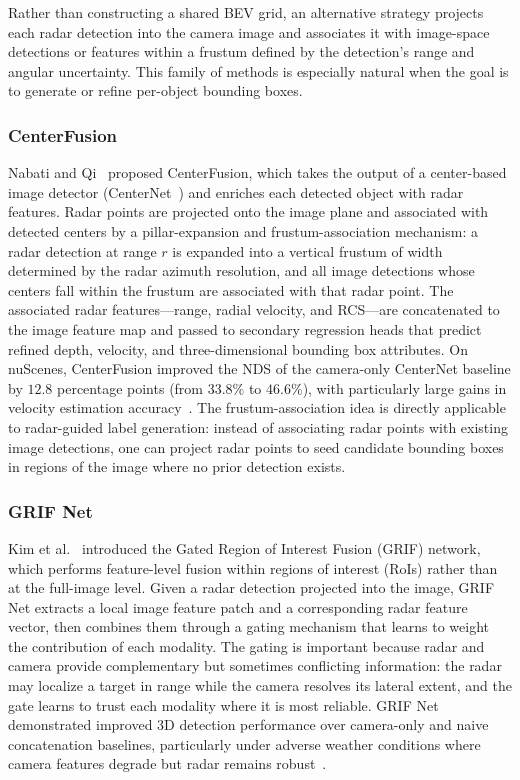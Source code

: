 Rather than constructing a shared BEV grid, an alternative strategy projects each radar detection into the camera image and associates it with image-space detections or features within a frustum defined by the detection's range and angular uncertainty. This family of methods is especially natural when the goal is to generate or refine per-object bounding boxes.

\subsubsection{CenterFusion}

Nabati and Qi~\cite{Nabati2021CenterFusion} proposed CenterFusion, which takes the output of a center-based image detector (CenterNet~\cite{zhou2019objects}) and enriches each detected object with radar features. Radar points are projected onto the image plane and associated with detected centers by a pillar-expansion and frustum-association mechanism: a radar detection at range $r$ is expanded into a vertical frustum of width determined by the radar azimuth resolution, and all image detections whose centers fall within the frustum are associated with that radar point. The associated radar features---range, radial velocity, and RCS---are concatenated to the image feature map and passed to secondary regression heads that predict refined depth, velocity, and three-dimensional bounding box attributes. On nuScenes, CenterFusion improved the NDS of the camera-only CenterNet baseline by $12.8$ percentage points (from $33.8\%$ to $46.6\%$), with particularly large gains in velocity estimation accuracy~\cite{Nabati2021CenterFusion}. The frustum-association idea is directly applicable to radar-guided label generation: instead of associating radar points with existing image detections, one can project radar points to seed candidate bounding boxes in regions of the image where no prior detection exists.

\subsubsection{GRIF Net}

Kim et al.~\cite{Kim2020GRIFNet} introduced the Gated Region of Interest Fusion (GRIF) network, which performs feature-level fusion within regions of interest (RoIs) rather than at the full-image level. Given a radar detection projected into the image, GRIF Net extracts a local image feature patch and a corresponding radar feature vector, then combines them through a gating mechanism that learns to weight the contribution of each modality. The gating is important because radar and camera provide complementary but sometimes conflicting information: the radar may localize a target in range while the camera resolves its lateral extent, and the gate learns to trust each modality where it is most reliable. GRIF Net demonstrated improved 3D detection performance over camera-only and naive concatenation baselines, particularly under adverse weather conditions where camera features degrade but radar remains robust~\cite{Kim2020GRIFNet}.

